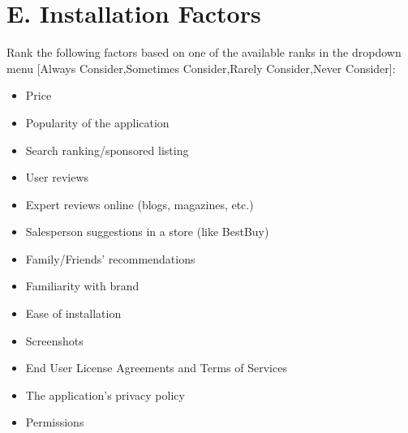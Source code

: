 \documentclass{sigchi}
\begin{document}
\section{E. Installation Factors}
Rank the following factors based on one of the available ranks in the dropdown menu [Always Consider,Sometimes Consider,Rarely Consider,Never Consider]:
\begin{itemize}
\item Price
\item Popularity of the application
\item Search ranking/sponsored listing
\item User reviews
\item Expert reviews online (blogs, magazines, etc.)
\item Salesperson suggestions in a store (like BestBuy)
\item Family/Friends' recommendations
\item Familiarity with brand
\item Ease of installation
\item Screenshots
\item End User License Agreements and Terms of Services
\item The application's privacy policy
\item Permissions
\end{itemize}
\end{document}
